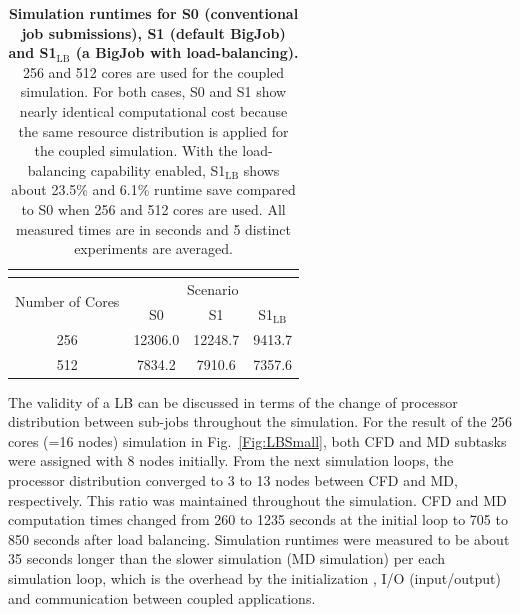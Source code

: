 \documentclass[preprint,12pt]{elsarticle}
\newcommand{\subscript}[1]{\ensuremath{_{\textrm{#1}}}}
\newcommand{\lb}[0]{\subscript{LB} }
\begin{document}
\begin{table}
  \caption{\small {\bf Simulation runtimes for S0 (conventional job submissions), 
S1 (default BigJob) and S1\lb (a BigJob with load-balancing).} 256 and 512
cores are used for the coupled simulation. For both cases, S0 and S1 show
nearly identical computational cost because the same resource distribution is
applied for the coupled simulation. With the load-balancing capability enabled,
S1\lb shows about 23.5\% and 6.1\% runtime save compared to S0 
when 256 and 512 cores are used.
All measured times are in seconds and 5 distinct experiments are averaged.}
\label{table:oneBJ_Test}
\centering
\footnotesize
 \begin{tabular}{c | c | c | c }
 \multicolumn{4}{c}{\phantom{\tiny 100}}\\
\hline
\multirow{2}{0.15\textwidth}{Number of Cores} & \multicolumn{3}{c}{Scenario} \\
\cline{2-4} 
& \multirow{1}{0.15\textwidth}{S0} & 
\multirow{1}{0.15\textwidth}{S1} & \multirow{1}{0.15\textwidth}{S1\lb} \\
\hline
\hline
256 & 12306.0 & 12248.7 & 9413.7 \\
512 & 7834.2 & 7910.6 & 7357.6 \\ 
\hline
\end{tabular} %
\vspace{-1em}
\end{table}


The validity of a LB can be discussed in terms of the change of processor distribution between sub-jobs throughout the simulation. For the result of the 256 cores (=16 nodes) simulation in Fig.~\ref{Fig:LBSmall}, both CFD and MD subtasks were assigned with 8 nodes initially. From the next simulation loops, the processor distribution converged to 3 to 13 nodes between CFD and MD, respectively. This ratio was maintained throughout the simulation. CFD and MD computation times changed from 260 to 1235 seconds at the initial loop to 705 to 850 seconds after load balancing. Simulation runtimes were measured to be about 35 seconds longer than the slower simulation (MD simulation) per each simulation loop, which is the overhead by the initialization , I/O (input/output) and communication between coupled applications.
\end{document}
